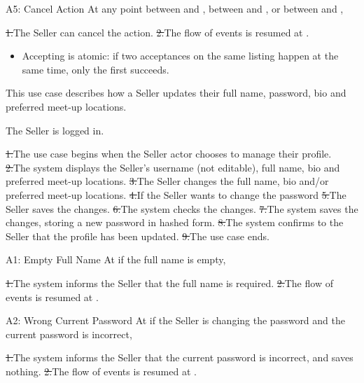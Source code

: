 \begin{flowblock}{A5: Cancel Action}
At any point between  and , between  and , or between  and ,\par
\st{1.}{The Seller can cancel the action.}
\st{2.}{The flow of events is resumed at .}
\end{flowblock}
\begin{itemize}
  \item Accepting is atomic: if two acceptances on the same listing happen at the same time, only the first succeeds.
\end{itemize}

This use case describes how a Seller updates their full name, password, bio and preferred meet-up locations.\par
{}
The Seller is logged in.\par
{}
\st{1.}{The use case begins when the Seller actor chooses to manage their profile.}
\st{2.}{The system displays the Seller's username (not editable), full name, bio and preferred meet-up locations.}
\st{3.}{The Seller changes the full name, bio and/or preferred meet-up locations.}
\st{4.}{If the Seller wants to change the password}
\st{5.}{The Seller saves the changes.}
\st{6.}{The system checks the changes.}
\st{7.}{The system saves the changes, storing a new password in hashed form.}
\st{8.}{The system confirms to the Seller that the profile has been updated.}
\st{9.}{The use case ends.}
\begin{flowblock}{A1: Empty Full Name}
At  if the full name is empty,\par
\st{1.}{The system informs the Seller that the full name is required.}
\st{2.}{The flow of events is resumed at .}
\end{flowblock}
\begin{flowblock}{A2: Wrong Current Password}
At  if the Seller is changing the password and the current password is incorrect,\par
\st{1.}{The system informs the Seller that the current password is incorrect, and saves nothing.}
\st{2.}{The flow of events is resumed at .}
\end{flowblock}
